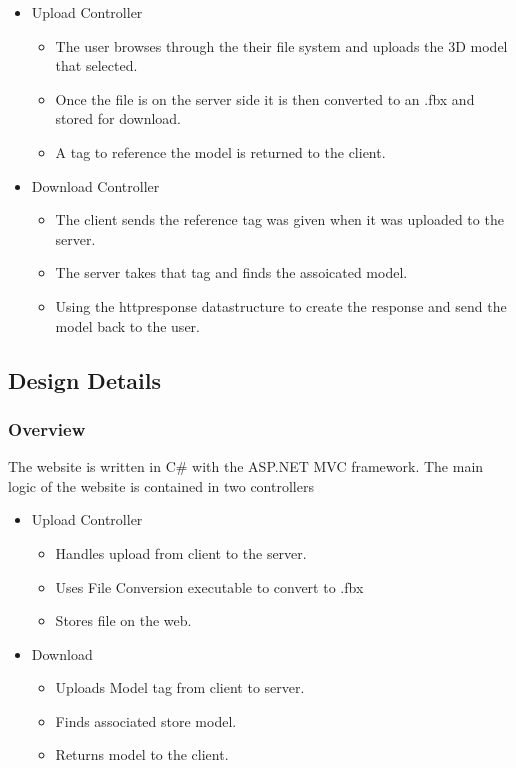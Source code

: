     \begin{itemize}
        \item Upload Controller
        \begin{itemize}
            \item The user browses through the their file system and uploads
            the 3D model that selected.
            \item Once the file is on the server side it is then converted to an
            .fbx and stored for download.
            \item A tag to reference the model is returned to the client.
        \end{itemize}
        
        \item Download Controller
        \begin{itemize}
            \item The client sends the reference tag was given when it was uploaded to the server.
            \item The server takes that tag and finds the assoicated model.
            \item Using the httpresponse datastructure to create the response and send
            the model back to the user.
        \end{itemize}
    \end{itemize}


\subsection{Design Details}

    \subsubsection{Overview}

    The website is written in C\# with the ASP.NET MVC framework. The main logic
    of the website is contained in two controllers
    \begin{itemize}
        \item Upload Controller
        \begin{itemize}
            \item Handles upload from client to the server.
            \item Uses File Conversion executable to convert to .fbx
            \item Stores file on the web.
        \end{itemize}
        \item Download
        \begin{itemize}
            \item Uploads Model tag from client to server.
            \item Finds associated store model.
            \item Returns model to the client.
        \end{itemize}
    \end{itemize}

